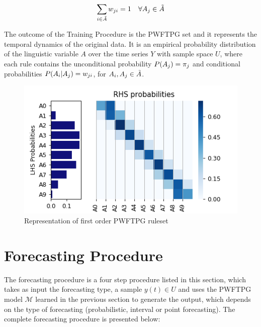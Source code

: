 \begin{enumerate}
\begin{equation}
    \sum_{i \in \tilde{A}} w_{ji} = 1 \quad \forall A_j \in \tilde{A}
    \label{eqn:aposteriori_condition}
\end{equation}


\end{enumerate}

The outcome of the Training Procedure is the PWFTPG set and it represents the temporal dynamics of the original data. It is an empirical probability distribution of the linguistic variable $A$ over the time series $Y$ with sample space $U$, where each rule contains the unconditional probability $P(A_j) = \pi_j$ and conditional probabilities $P(A_i | A_j) = w_{ji}$, for $A_i,A_j \in \tilde{A}$.

\begin{figure}
    \centering
    \includegraphics{figures/pwfts_rules_firstorder.png}
    \caption{Representation of first order PWFTPG ruleset}
    \label{fig:pwfts_rules_firstorder}
\end{figure}


\section{Forecasting Procedure}
\label{sec:pwfts_forecasting}

The forecasting procedure is a four step procedure listed in this section, which takes as input the forecasting type, a sample $y(t) \in U$ and uses the PWFTPG model $\mathcal{M}$ learned in the previous section to generate the output, which depends on the type of forecasting  (probabilistic, interval or point forecasting).  The complete forecasting procedure is presented below:

